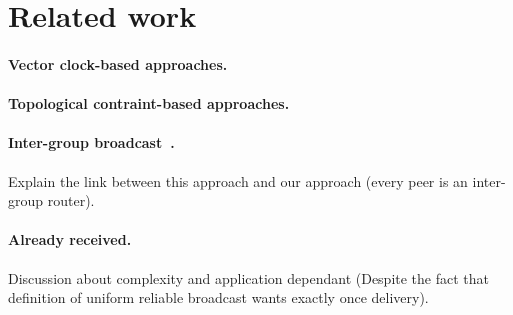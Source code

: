 
\section{Related work}
\label{sec:relatedwork}


\paragraph{Vector clock-based approaches.}
\paragraph{Topological contraint-based approaches.}

\paragraph{Inter-group
  broadcast~\cite{johnson1998scalable,johnson1999intergroup}.} Explain the link
between this approach and our approach (every peer is an inter-group router).


\paragraph{Already received.} Discussion about complexity and application
dependant (Despite the fact that definition of uniform reliable broadcast wants
exactly once delivery).

